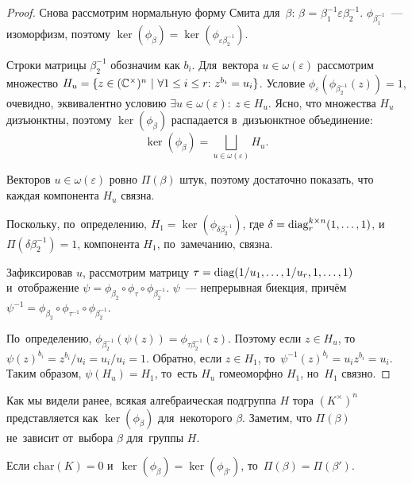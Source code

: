 \documentclass{article}
\begin{document}
\begin{proof}
    Снова рассмотрим нормальную форму Смита для~$\beta$: $\beta$ = $\beta_1^{-1} \varepsilon \beta_2^{-1}$.
    $\phi_{\beta_1^{-1}}$~— изоморфизм, поэтому $\ker(\phi_{\beta}) = \ker(\phi_{\varepsilon \beta_2^{-1}})$.

    Строки матрицы $\beta_2^{-1}$ обозначим как $b_i$.
    Для~вектора $u \in \omega(\varepsilon)$ рассмотрим множество $H_u = \{z \in (\mathbb{C}^\times)^n \ | \ \forall 1 \leq i \leq r{:}\ z^{b_i} = u_i\}$.
    Условие $\phi_\varepsilon(\phi_{\beta_2^{-1}}(z)) = 1$, очевидно, эквивалентно условию $\exists u \in \omega(\varepsilon){:}\ z \in H_u$.
    Ясно, что множества $H_u$ дизъюнктны, поэтому $\ker(\phi_{\beta})$ распадается в~дизъюнктное объединение:
    $$
        \ker(\phi_{\beta}) = \bigsqcup_{u \in \omega(\varepsilon)} H_u.
    $$

    Векторов $u \in \omega(\varepsilon)$ ровно $\Pi(\beta)$ штук, поэтому достаточно показать, что каждая компонента $H_u$ связна.

    Поскольку, по~определению, $H_1 = \ker(\phi_{\delta \beta_2^{-1}})$, где $\delta = \mathrm{diag}^{k \times n}_r(1, \ldots, 1)$,
    и~$\Pi(\delta \beta_2^{-1}) = 1$, компонента $H_1$, по~замечанию, связна.

    Зафиксировав $u$, рассмотрим матрицу $\tau = \mathrm{diag}(1 / u_1, \ldots, 1 / u_r, 1, \ldots, 1)$ и~отображение $\psi = \phi_{\beta_2} \circ \phi_\tau \circ \phi_{\beta_2^{-1}}$.
    $\psi$~— непрерывная биекция, причём $\psi^{-1} = \phi_{\beta_2} \circ \phi_{\tau^{-1}} \circ \phi_{\beta_2^{-1}}$.

    По~определению, $\phi_{\beta_2^{-1}}(\psi(z)) = \phi_{\tau \beta_2^{-1}}(z)$.
    Поэтому если $z \in H_u$, то~$\psi(z)^{b_i} = z^{b_i} / u_i = u_i / u_i = 1$. Обратно, если $z \in H_1$,
    то~$\psi^{-1}(z)^{b_i} = u_i z^{b_i} = u_i$. Таким образом, $\psi(H_u) = H_1$,
    то~есть $H_u$ гомеоморфно $H_1$, но~$H_1$ связно.
\end{proof}

Как мы видели ранее, всякая алгебраическая подгруппа $H$ тора $(K^\times)^n$ представляется как $\ker(\phi_\beta)$
для~некоторого $\beta$. Заметим, что $\Pi(\beta)$ не~зависит от~выбора $\beta$ для~группы $H$.

\begin{theorem}
    Если $\mathrm{char}(K) = 0$ и~$\ker(\phi_{\beta}) = \ker(\phi_{\beta'})$, то~$\Pi(\beta) = \Pi(\beta')$.
\end{theorem}
\end{document}

